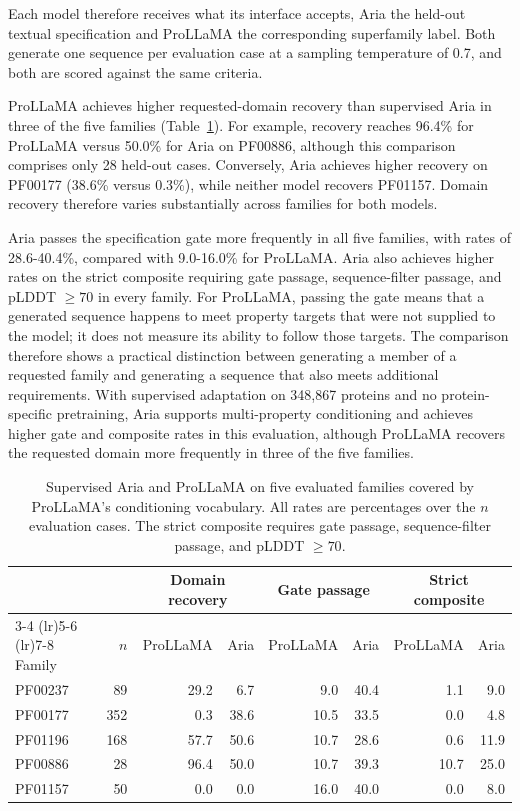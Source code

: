 \documentclass{article} %
\newcommand{\pct}{\%}
\begin{document}
Each model therefore receives what its interface accepts, Aria the held-out
textual specification and ProLLaMA the corresponding superfamily label. Both
generate one sequence per evaluation case at a sampling temperature of 0.7,
and both are scored against the same criteria.


ProLLaMA achieves higher requested-domain recovery than
supervised Aria in three of the five families
(Table~\ref{tab:prollama}). For example, recovery reaches
96.4\pct{} for ProLLaMA versus 50.0\pct{} for Aria on
PF00886, although this comparison comprises only 28 held-out
cases. Conversely, Aria achieves higher recovery on PF00177
(38.6\pct{} versus 0.3\pct{}), while neither model recovers
PF01157. Domain recovery therefore varies substantially
across families for both models.

Aria passes the specification gate more frequently in all five families, with rates of 28.6-40.4\%, compared with 9.0-16.0\% for ProLLaMA. Aria also achieves higher rates on the strict composite requiring gate passage, sequence-filter passage, and pLDDT $\geq70$ in every family. For ProLLaMA, passing the gate means that a generated sequence happens to meet property targets that were not supplied to the model; it does not measure its ability to follow those targets. The comparison therefore shows a practical distinction between generating a member of a requested family and generating a sequence that also meets additional requirements. With supervised adaptation on 348{,}867 proteins and no protein-specific pretraining, Aria supports multi-property conditioning and achieves higher gate and composite rates in this evaluation, although ProLLaMA recovers the requested domain more frequently in three of the five families.

\begin{table}[t]
\caption{Supervised Aria and ProLLaMA on five evaluated families
covered by ProLLaMA's conditioning vocabulary.  All rates are percentages over the $n$ evaluation cases. The strict composite requires gate passage, sequence-filter passage, and pLDDT $\geq70$.\\}
\label{tab:prollama}
\centering
\small
\setlength{\tabcolsep}{3pt}
\begin{tabular}{@{}lr*{6}{r}@{}}
\toprule
 & & \multicolumn{2}{c}{Domain recovery}
   & \multicolumn{2}{c}{Gate passage}
   & \multicolumn{2}{c}{Strict composite} \\
\cmidrule(lr){3-4}
\cmidrule(lr){5-6}
\cmidrule(lr){7-8}
Family & $n$
 & ProLLaMA & Aria
 & ProLLaMA & Aria
 & ProLLaMA & Aria \\
\midrule
PF00237 & 89
 & 29.2 & 6.7 & 9.0 & 40.4 & 1.1 & 9.0 \\
PF00177 & 352
 & 0.3 & 38.6 & 10.5 & 33.5 & 0.0 & 4.8 \\
PF01196 & 168
 & 57.7 & 50.6 & 10.7 & 28.6 & 0.6 & 11.9 \\
PF00886 & 28
 & 96.4 & 50.0 & 10.7 & 39.3 & 10.7 & 25.0 \\
PF01157 & 50
 & 0.0 & 0.0 & 16.0 & 40.0 & 0.0 & 8.0 \\
\bottomrule
\end{tabular}
\end{table}
\end{document}
